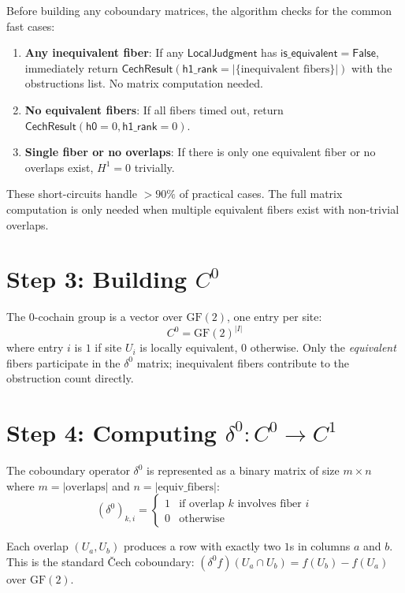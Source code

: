 \documentclass[11pt,a4paper]{report}
\theoremstyle{definition}
\theoremstyle{plain}
\newcommand{\Hone}{H^1}
\begin{document}
Before building any coboundary matrices, the algorithm checks for
the common fast cases:

\begin{enumerate}
  \item \textbf{Any inequivalent fiber}: If any
    $\mathsf{LocalJudgment}$ has $\mathsf{is\_equivalent} = \mathsf{False}$,
    immediately return
    $\mathsf{CechResult}(\mathsf{h1\_rank} = |\{\text{inequivalent fibers}\}|)$
    with the obstructions list.
    No matrix computation needed.
  \item \textbf{No equivalent fibers}: If all fibers timed out,
    return $\mathsf{CechResult}(\mathsf{h0} = 0, \mathsf{h1\_rank} = 0)$.
  \item \textbf{Single fiber or no overlaps}: If there is only one
    equivalent fiber or no overlaps exist, $\Hone = 0$ trivially.
\end{enumerate}

These short-circuits handle $>90\%$ of practical cases.  The full
matrix computation is only needed when multiple equivalent fibers
exist with non-trivial overlaps.

\section{Step 3: Building $C^0$}

The 0-cochain group is a vector over $\mathrm{GF}(2)$, one entry per
site:
\[
  C^0 = \mathrm{GF}(2)^{|I|}
\]
where entry $i$ is $1$ if site $U_i$ is locally equivalent, $0$
otherwise.  Only the \emph{equivalent} fibers participate in the
$\delta^0$ matrix; inequivalent fibers contribute to the
obstruction count directly.

\section{Step 4: Computing $\delta^0 : C^0 \to C^1$}

The coboundary operator $\delta^0$ is represented as a binary
matrix of size $m \times n$ where $m = |\mathrm{overlaps}|$ and
$n = |\mathrm{equiv\_fibers}|$:
\[
  (\delta^0)_{k,i} = \begin{cases}
    1 & \text{if overlap $k$ involves fiber $i$} \\
    0 & \text{otherwise}
  \end{cases}
\]

Each overlap $(U_a, U_b)$ produces a row with exactly two $1$s
in columns $a$ and $b$.  This is the standard \v{C}ech coboundary:
$(\delta^0 f)(U_a \cap U_b) = f(U_b) - f(U_a)$ over
$\mathrm{GF}(2)$.
\end{document}
